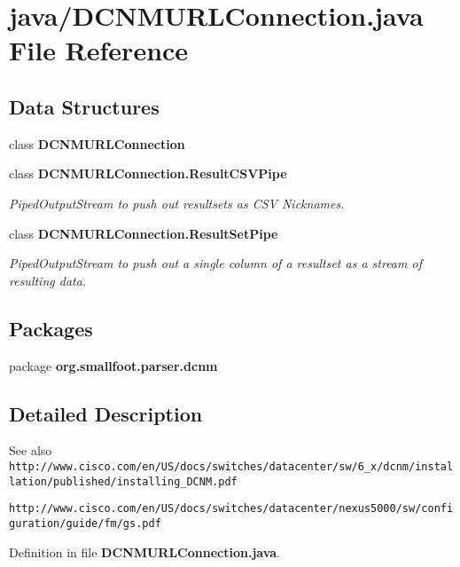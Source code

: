 \section{java/\+D\+C\+N\+M\+U\+R\+L\+Connection.java File Reference}
\label{DCNMURLConnection_8java}
\subsection*{Data Structures}
\begin{DoxyCompactItemize}
\item 
class {\bf D\+C\+N\+M\+U\+R\+L\+Connection}
\item 
class {\bfseries D\+C\+N\+M\+U\+R\+L\+Connection.\+Result\+C\+S\+V\+Pipe}
\begin{DoxyCompactList}\small\item\em Piped\+Output\+Stream to push out resultsets as C\+S\+V Nicknames. \end{DoxyCompactList}\item 
class {\bfseries D\+C\+N\+M\+U\+R\+L\+Connection.\+Result\+Set\+Pipe}
\begin{DoxyCompactList}\small\item\em Piped\+Output\+Stream to push out a single column of a resultset as a stream of resulting data. \end{DoxyCompactList}\end{DoxyCompactItemize}
\subsection*{Packages}
\begin{DoxyCompactItemize}
\item 
package {\bf org.\+smallfoot.\+parser.\+dcnm}
\end{DoxyCompactItemize}


\subsection{Detailed Description}
\begin{DoxySeeAlso}{See also}
{\tt http\+://www.\+cisco.\+com/en/\+U\+S/docs/switches/datacenter/sw/6\+\_\+x/dcnm/installation/published/installing\+\_\+\+D\+C\+N\+M.\+pdf} 

{\tt http\+://www.\+cisco.\+com/en/\+U\+S/docs/switches/datacenter/nexus5000/sw/configuration/guide/fm/gs.\+pdf} 
\end{DoxySeeAlso}


Definition in file {\bf D\+C\+N\+M\+U\+R\+L\+Connection.\+java}.

